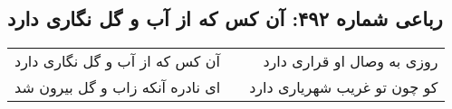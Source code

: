\begin{center}
\section*{رباعی شماره ۴۹۲: آن کس که از آب و گل نگاری دارد}
\label{sec:0492}
\begin{longtable}{l p{0.5cm} r}
آن کس که از آب و گل نگاری دارد
&&
روزی به وصال او قراری دارد
\\
ای نادره آنکه زاب و گل بیرون شد
&&
کو چون تو غریب شهریاری دارد
\\
\end{longtable}
\end{center}
